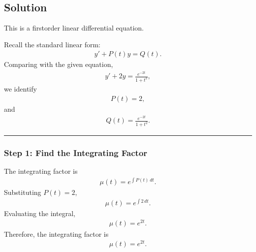 \documentclass[letterpaper,10pt,english]{sphinxmanual}
\begin{document}
\subsection{Solution}
\label{\detokenize{Language/Science_language/ODE_calculus/course_MATH_3035/homework_assignments/index_pdf:id2}}
\sphinxAtStartPar
This is a first\sphinxhyphen{}order linear differential equation.

\sphinxAtStartPar
Recall the standard linear form:
\begin{equation*}
\begin{split}y' + P(t)y = Q(t).\end{split}
\end{equation*}
\sphinxAtStartPar
Comparing with the given equation,
\begin{equation*}
\begin{split}y' + 2y = \frac{e^{-2t}}{1+t^2},\end{split}
\end{equation*}
\sphinxAtStartPar
we identify
\begin{equation*}
\begin{split}P(t)=2,\end{split}
\end{equation*}
\sphinxAtStartPar
and
\begin{equation*}
\begin{split}Q(t)=\frac{e^{-2t}}{1+t^2}.\end{split}
\end{equation*}

\bigskip\hrule\bigskip



\subsubsection{Step 1: Find the Integrating Factor}
\label{\detokenize{Language/Science_language/ODE_calculus/course_MATH_3035/homework_assignments/index_pdf:step-1-find-the-integrating-factor}}
\sphinxAtStartPar
The integrating factor is
\begin{equation*}
\begin{split}\mu(t)=e^{\int P(t)\,dt}.\end{split}
\end{equation*}
\sphinxAtStartPar
Substituting \(P(t)=2\),
\begin{equation*}
\begin{split}\mu(t)=e^{\int 2\,dt}.\end{split}
\end{equation*}
\sphinxAtStartPar
Evaluating the integral,
\begin{equation*}
\begin{split}\mu(t)=e^{2t}.\end{split}
\end{equation*}
\sphinxAtStartPar
Therefore, the integrating factor is
\begin{equation*}
\begin{split}\boxed{\mu(t)=e^{2t}}.\end{split}
\end{equation*}
\end{document}
